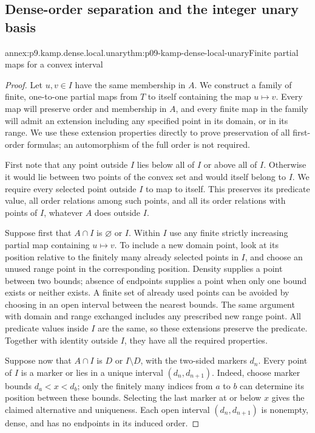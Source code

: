 
\subsection{Dense-order separation and the integer unary basis}
\label{sec:annex-p09-kamp-iv2-integer-basis}

\begin{annexitem}{annex:p9.kamp.dense.local.unary}{thm:p09-kamp-dense-local-unary}{Finite partial maps for a convex interval}
\begin{proof}
Let \(u,v\in I\) have the same membership in \(A\).
We construct a family of finite, one-to-one partial maps from
\(T\) to itself containing the map \(u\mapsto v\).
Every map will preserve order and membership in \(A\), and
every finite map in the family will admit an extension including
any specified point in its domain, or in its range. We use these
extension properties directly to prove preservation of all
first-order formulas; an automorphism of the full order is not
required.

First note that any point outside \(I\) lies below all of
\(I\) or above all of \(I\). Otherwise it would lie
between two points of the convex set and would itself belong
to \(I\). We require every selected point outside \(I\)
to map to itself. This preserves its predicate value, all order
relations among such points, and all its order relations with
points of \(I\), whatever \(A\) does outside \(I\).

Suppose first that \(A\cap I\) is \(\varnothing\) or
\(I\). Within \(I\) use any finite strictly increasing
partial map containing \(u\mapsto v\). To include a new
domain point, look at its position relative to the finitely many
already selected points in \(I\), and choose an unused range
point in the corresponding position. Density supplies a point
between two bounds; absence of endpoints supplies a point when
only one bound exists or neither exists. A finite set of already
used points can be avoided by choosing in an open interval
between the nearest bounds. The same argument with domain and
range exchanged includes any prescribed new range point.
All predicate values inside \(I\) are the same, so these
extensions preserve the predicate. Together with identity outside
\(I\), they have all the required properties.

Suppose now that \(A\cap I\) is \(D\) or
\(I\setminus D\), with the two-sided markers \(d_n\).
Every point of \(I\) is a marker or lies in a unique interval
\((d_n,d_{n+1})\). Indeed, choose marker bounds
\(d_a<x<d_b\); only the finitely many indices from \(a\)
to \(b\) can determine its position between these bounds.
Selecting the last marker at or below \(x\) gives the claimed
alternative and uniqueness. Each open interval
\((d_n,d_{n+1})\) is nonempty, dense, and has no endpoints
in its induced order.


\end{proof}
\end{annexitem}
